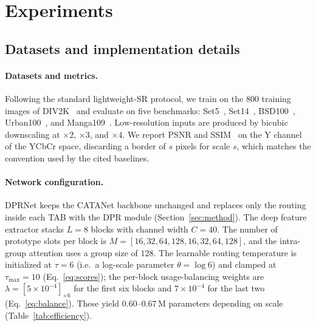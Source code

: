 \section{Experiments}
\label{sec:experiments}

\subsection{Datasets and implementation details}
\label{sec:exp_setup}

\paragraph{Datasets and metrics.}
Following the standard lightweight-SR protocol, we train on the $800$ training
images of DIV2K~\cite{agustsson2017div2k} and evaluate on five benchmarks:
Set5~\cite{bevilacqua2012set5}, Set14~\cite{zeyde2010set14},
BSD100~\cite{martin2001bsd100}, Urban100~\cite{huang2015urban100}, and
Manga109~\cite{matsui2017manga109}. Low-resolution inputs are produced by
bicubic downscaling at $\times2$, $\times3$, and $\times4$. We report PSNR and
SSIM~\cite{wang2004ssim} on the Y channel of the YCbCr space, discarding a border
of $s$ pixels for scale $s$, which matches the convention used by the cited
baselines.

\paragraph{Network configuration.}
DPRNet keeps the CATANet backbone unchanged and replaces only the routing inside
each TAB with the DPR module (Section~\ref{sec:method}). The deep feature extractor
stacks $L{=}8$ blocks with channel width $C{=}40$. The number of prototype slots
per block is $M=[16,32,64,128,16,32,64,128]$, and the intra-group attention uses a
group size of $128$. The learnable routing temperature is initialized at $\tau{=}6$
(i.e.\ a log-scale parameter $\theta{=}\log 6$) and clamped at $\tau_{\max}{=}10$
(Eq.~\eqref{eq:scores}); the per-block usage-balancing weights are
$\lambda=[5{\times}10^{-4}]_{\times6}$ for the first six blocks and
$7{\times}10^{-4}$ for the last two (Eq.~\eqref{eq:balance}). These yield
$0.60$--$0.67$\,M parameters depending on scale (Table~\ref{tab:efficiency}).

